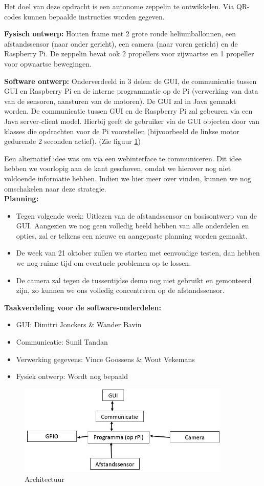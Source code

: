 \documentclass{peno-opdracht1}
\begin{document}
\maketitle

Het doel van deze opdracht is een autonome zeppelin te ontwikkelen. Via QR-codes kunnen bepaalde instructies worden gegeven.

\textbf{Fysisch ontwerp:} Houten frame met 2 grote ronde heliumballonnen, een afstandssensor (naar onder gericht), een camera (naar voren gericht) en de Raspberry Pi. De zeppelin bevat ook 2 propellers voor zijwaartse en 1 propeller voor opwaartse bewegingen.

\textbf{Software ontwerp:} Onderverdeeld in 3 delen: de GUI, de communicatie tussen GUI en Raspberry Pi en de interne programmatie op de Pi (verwerking van data van de sensoren, aansturen van de motoren).
De GUI zal in Java gemaakt worden. De communicatie tussen GUI en de Raspberry Pi zal gebeuren via een Java server-client model. Hierbij geeft de gebruiker via de GUI objecten door van klasses die opdrachten voor de Pi voorstellen (bijvoorbeeld de linkse motor gedurende 2 seconden actief). (Zie figuur \ref{schema})

Een alternatief idee was om via een webinterface te communiceren. Dit idee hebben we voorlopig aan de kant geschoven, omdat we hierover nog niet voldoende informatie hebben. Indien we hier meer over vinden, kunnen we nog omschakelen naar deze strategie.\\

\textbf{Planning:}
\begin{itemize}
\item Tegen volgende week: Uitlezen van de afstandssensor en basisontwerp van de GUI. Aangezien we nog geen volledig beeld hebben van alle onderdelen en opties, zal er telkens een nieuwe en aangepaste planning worden gemaakt.
\item De week van 21 oktober zullen we starten met eenvoudige testen, dan hebben we nog ruime tijd om eventuele problemen op te lossen.
\item De camera zal tegen de tussentijdse demo nog niet gebruikt en gemonteerd zijn, zo kunnen we ons volledig concentreren op de afstandssensor.
\end{itemize}


\textbf{Taakverdeling voor de software-onderdelen:}
\begin{itemize}
\item GUI: Dimitri Jonckers \& Wander Bavin
\item Communicatie: Sunil Tandan
\item Verwerking gegevens: Vince Goossens \& Wout Vekemans
\item Fysiek ontwerp: Wordt nog bepaald
\end{itemize}

\begin{figure}[ht!]
\centering
\includegraphics[height=43mm]{Schema.jpg}
\caption{Architectuur}
\label{schema}
\end{figure}
\end{document}
